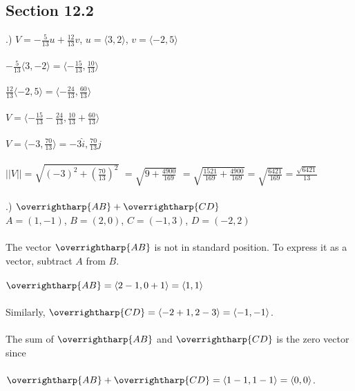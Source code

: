 \documentclass[12pt]{article}
\begin{document}
\subsection*{Section 12.2}

.) $V = -\frac{5}{13}u + \frac{12}{13}v$, 
\hspace{10pt} $u = \langle3, 2\rangle$, \hspace{10pt} $v = \langle-2, 5\rangle$\\\\
$-\frac{5}{13}\langle3, -2\rangle = \langle-\frac{15}{13}, \frac{10}{13}\rangle$\\\\
$\frac{12}{13}\langle-2, 5\rangle = \langle-\frac{24}{13}, \frac{60}{13}\rangle$\\\\
$V = \langle-\frac{15}{13} - \frac{24}{13} , \frac{10}{13} + \frac{60}{13}\rangle$\\\\
$V = \langle-3, \frac{70}{13}\rangle = -3\hat{i}, \frac{70}{13}\hat{j}$\\\\

\noindent$||V|| = \sqrt{(-3)^{2} + (\frac{70}{13})^{2}}$
$=\sqrt{9 + \frac{4900}{169}}$
$=\sqrt{\frac{1521}{169} + \frac{4900}{169}} = \sqrt{\frac{6421}{169}} = \frac{\sqrt{6421}}{13}$\\\\

.) $\overrightharp{AB} + \overrightharp{CD}$\\
$A = (1,-1)$, \hspace{10pt} $B = (2, 0)$, \hspace{10pt} $C = (-1, 3)$, \hspace{10pt} $D = (-2, 2)$\\\\

\noindent The vector $\overrightharp{AB}$ is not in standard position. To express it as a vector, subtract 
$A$ from $B$.\\\\ $\overrightharp{AB} = \langle 2-1, 0+1\rangle = \langle 1, 1 \rangle$\\\\
Similarly, $\overrightharp{CD} = \langle -2+1, 2-3\rangle = \langle -1, -1\rangle$.\\\\
The sum of $\overrightharp{AB}$ and $\overrightharp{CD}$ is the zero vector since \\\\
$\overrightharp{AB} + \overrightharp{CD} = \langle 1-1, 1-1\rangle = \langle 0, 0\rangle$.\\\\
\end{document}
